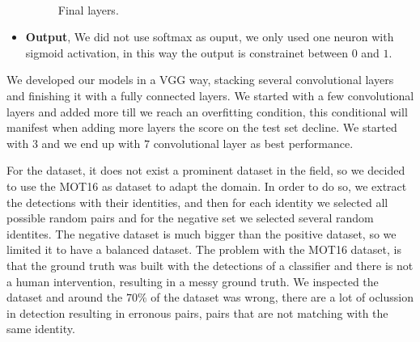 \begin{itemize}
\begin{figure}[H]
\\



\caption{Final layers.}
\label{siameseData2}
\end{figure}


\item \textbf{Output}, We did not use softmax as ouput, we only used one neuron with sigmoid activation, in this way the output is constrainet between $0$ and $1$.



\end{itemize}


We developed our models in a VGG way, stacking  several convolutional layers and finishing it with a fully connected layers. We started with a few convolutional layers and added more till we reach an overfitting condition, this conditional will manifest when adding more layers the score on the test set decline. We started with $3$ and we end up with $7$ convolutional layer as best performance.

For the dataset, it does not exist a prominent dataset in the field, so we decided to use the MOT16 as dataset to adapt the domain. In order to do so, we extract the detections with their identities, and then for each identity we selected all possible random pairs and for the negative set we selected several random identites. The negative dataset is much bigger than the positive dataset, so we limited it to have a balanced dataset. The problem with the MOT16 dataset, is that the ground truth was built with the detections of a classifier and there is not a human intervention, resulting in a messy ground truth. We inspected the dataset and around the $70 \%$ of the dataset was wrong, there are a lot of oclussion in detection resulting in erronous pairs, pairs that are not matching with the same identity.

